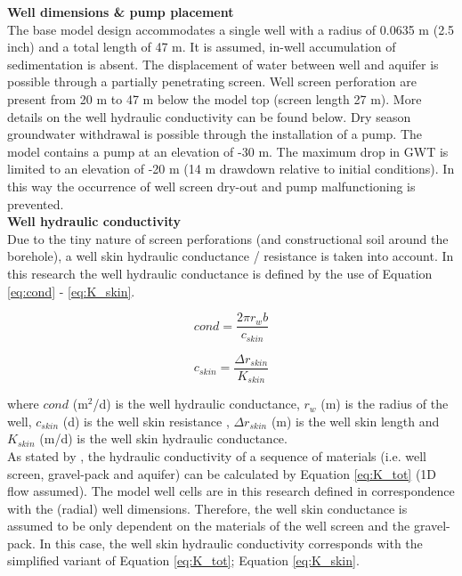 \textbf{Well dimensions \& pump placement} \\
The base model design accommodates a single well with a radius of 0.0635 m (2.5 inch) and a total length of 47 m. It is assumed, in-well accumulation of sedimentation is absent. The displacement of water between well and aquifer is possible through a partially penetrating screen. Well screen perforation are present from 20 m to 47 m below the model top (screen length 27 m). More details on the well hydraulic conductivity can be found below. Dry season groundwater withdrawal is possible through the installation of a pump. The model contains a pump at an elevation of -30 m. The maximum drop in GWT is limited to an elevation of -20 m (14 m drawdown relative to initial conditions). In this way the occurrence of well screen dry-out and pump malfunctioning is prevented. \\

\textbf{Well hydraulic conductivity} \\
Due to the tiny nature of screen perforations (and constructional soil around the borehole), a well skin hydraulic conductance / resistance is taken into account. In this research the well hydraulic conductance is defined by the use of Equation \ref{eq:cond} - \ref{eq:K_skin}. 

\begin{equation}
 cond = \frac{2\pi r_w b}{c_{skin}}
\label{eq:cond}
\end{equation}

\begin{equation}
 c_{skin} = \frac{\Delta r_{skin}}{K_{skin}}
\label{eq:c_skin}
\end{equation}

where $cond$ (m$^2$/d) is the well hydraulic conductance, $r_w$ (m) is the radius of the well, $c_{skin}$ (d) is the well skin resistance , $\Delta r_{skin}$ (m) is the well skin length and $K_{skin}$ (m/d) is the well skin hydraulic conductance. \\

As stated by \citet{Houben2015}, the hydraulic conductivity of a sequence of materials (i.e. well screen, gravel-pack and aquifer) can be calculated by Equation \ref{eq:K_tot} (1D flow assumed). The model well cells are in this research defined in correspondence with the (radial) well dimensions. Therefore, the well skin conductance is assumed to be only dependent on the materials of the well screen and the gravel-pack. In this case, the well skin hydraulic conductivity corresponds with the simplified variant of Equation \ref{eq:K_tot}; Equation \ref{eq:K_skin}.  

